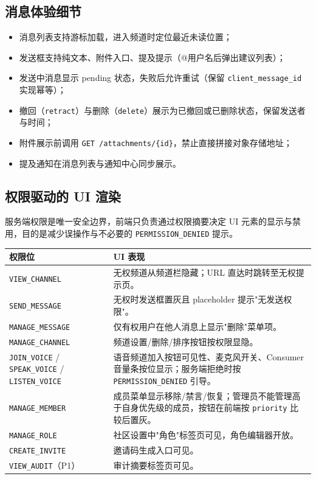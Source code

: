 \subsection{消息体验细节}

\begin{itemize}
  \item 消息列表支持游标加载，进入频道时定位最近未读位置；
  \item 发送框支持纯文本、附件入口、提及提示（@用户名后弹出建议列表）；
  \item 发送中消息显示 pending 状态，失败后允许重试（保留 \texttt{client\_message\_id} 实现幂等）；
  \item 撤回（\texttt{retract}）与删除（\texttt{delete}）展示为已撤回或已删除状态，保留发送者与时间；
  \item 附件展示前调用 \texttt{GET /attachments/\{id\}}，禁止直接拼接对象存储地址；
  \item 提及通知在消息列表与通知中心同步展示。
\end{itemize}

\subsection{权限驱动的 UI 渲染}

服务端权限是唯一安全边界，前端只负责通过权限摘要决定 UI 元素的显示与禁用，目的是减少误操作与不必要的 \texttt{PERMISSION\_DENIED} 提示。

\noindent\begin{tabularx}{\textwidth}{L{3.8cm}Y}
  \toprule
  权限位 & UI 表现 \\
  \midrule
  \texttt{VIEW\_CHANNEL} & 无权频道从频道栏隐藏；URL 直达时跳转至无权提示页。 \\
  \texttt{SEND\_MESSAGE} & 无权时发送框置灰且 placeholder 提示"无发送权限"。 \\
  \texttt{MANAGE\_MESSAGE} & 仅有权用户在他人消息上显示"删除"菜单项。 \\
  \texttt{MANAGE\_CHANNEL} & 频道设置/删除/排序按钮按权限显隐。 \\
  \texttt{JOIN\_VOICE} / \texttt{SPEAK\_VOICE} / \texttt{LISTEN\_VOICE} & 语音频道加入按钮可见性、麦克风开关、Consumer 音量条按位显示；服务端拒绝时按 \texttt{PERMISSION\_DENIED} 引导。 \\
  \texttt{MANAGE\_MEMBER} & 成员菜单显示移除/禁言/恢复；管理员不能管理高于自身优先级的成员，按钮在前端按 \texttt{priority} 比较后置灰。 \\
  \texttt{MANAGE\_ROLE} & 社区设置中"角色"标签页可见，角色编辑器开放。 \\
  \texttt{CREATE\_INVITE} & 邀请码生成入口可见。 \\
  \texttt{VIEW\_AUDIT}（P1） & 审计摘要标签页可见。 \\
  \bottomrule
\end{tabularx}

